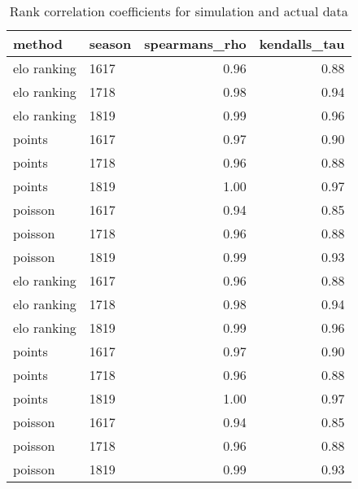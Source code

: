 \begin{table}[ht]
\centering
\begin{tabular}{llrr}
  \hline
method & season & spearmans\_rho & kendalls\_tau \\ 
  \hline
elo ranking & 1617 & 0.96 & 0.88 \\ 
  elo ranking & 1718 & 0.98 & 0.94 \\ 
  elo ranking & 1819 & 0.99 & 0.96 \\ 
  points & 1617 & 0.97 & 0.90 \\ 
  points & 1718 & 0.96 & 0.88 \\ 
  points & 1819 & 1.00 & 0.97 \\ 
  poisson & 1617 & 0.94 & 0.85 \\ 
  poisson & 1718 & 0.96 & 0.88 \\ 
  poisson & 1819 & 0.99 & 0.93 \\ 
  elo ranking & 1617 & 0.96 & 0.88 \\ 
  elo ranking & 1718 & 0.98 & 0.94 \\ 
  elo ranking & 1819 & 0.99 & 0.96 \\ 
  points & 1617 & 0.97 & 0.90 \\ 
  points & 1718 & 0.96 & 0.88 \\ 
  points & 1819 & 1.00 & 0.97 \\ 
  poisson & 1617 & 0.94 & 0.85 \\ 
  poisson & 1718 & 0.96 & 0.88 \\ 
  poisson & 1819 & 0.99 & 0.93 \\ 
   \hline
\end{tabular}
\caption{Rank correlation coefficients for simulation and actual data} 
\end{table} 
